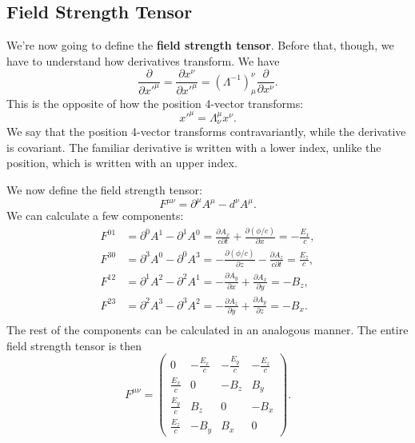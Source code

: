 \subsection{Field Strength Tensor}
We're now going to define the \textbf{field strength tensor}. Before that, though, we have to understand how derivatives transform. We have 
\begin{equation*}
    \frac{\partial}{\partial x'^{\mu}} = \frac{\partial x^{\nu}}{\partial x'^{\mu}} = (\Lambda^{-1})_\mu^\nu \frac{\partial}{\partial x^\nu}.
\end{equation*}
This is the opposite of how the position 4-vector transforms:
\begin{equation*}
    x'^{\mu} = \Lambda_{\nu}^{\mu} x^{\nu}.
\end{equation*} We say that the position 4-vector transforms contravariantly, while the derivative is covariant. The familiar derivative is written with a lower index, unlike the position, which is written with an upper index. 

We now define the field strength tensor:
\begin{equation}
    F^{\mu \nu} = \partial^\mu A^\mu - d^\nu A^\mu.
\end{equation}
We can calculate a few components:
\begin{align*}
    F^{01} &= \partial^0 A^1 - \partial^1 A^0 = \frac{\partial A_x}{c\partial t} + \frac{\partial(\phi/c)}{\partial x} = -\frac{E_x}{c}, \\
        F^{30} &= \partial^3 A^0 - \partial^0 A^3 = -\frac{\partial (\phi/c)}{\partial z} - \frac{\partial A_z}{c\partial t} = \frac{E_z}{c},\\
        F^{12} &= \partial^1 A^2 - \partial^2 A^1 = -\frac{\partial A_y}{\partial x} + \frac{\partial A_x}{\partial y} = -B_z,\\
        F^{23} &= \partial^2 A^3 - \partial^3 A^2 = -\frac{\partial A_z}{\partial y} + \frac{\partial A_y}{\partial z} = -B_x.\\
\end{align*}
The rest of the components can be calculated in an analogous manner. The entire field strength tensor is then 
\begin{equation}
    F^{\mu\nu} = \begin{pmatrix}
    0 & -\frac{E_x}{c} & -\frac{E_y}{c} & -\frac{E_z}{c} \\
    \frac{E_x}{c} & 0 & -B_z & B_y \\
    \frac{E_y}{c} & B_z & 0 & -B_x \\
    \frac{E_z}{c} & -B_y & B_x & 0
    \end{pmatrix}.
\end{equation}
